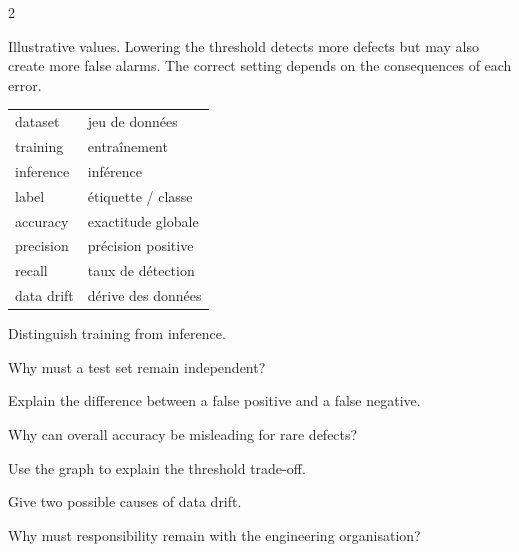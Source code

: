 \begin{multicols}{2}
\begin{tcolorbox}[title=\sffamily\bfseries Defect-detection trade-off,colback=white,colframe=ECPurple]
\begin{center}
\end{center}
\footnotesize Illustrative values. Lowering the threshold detects more defects but may also create more false alarms. The correct setting depends on the consequences of each error.
\end{tcolorbox}

\begin{vocabulary}
\begin{tabularx}{\linewidth}{@{}lX@{}}
dataset & jeu de données\\
training & entraînement\\
inference & inférence\\
label & étiquette / classe\\
accuracy & exactitude globale\\
precision & précision positive\\
recall & taux de détection\\
data drift & dérive des données
\end{tabularx}
\end{vocabulary}

\begin{questions}
\item Distinguish training from inference.
\item Why must a test set remain independent?
\item Explain the difference between a false positive and a false negative.
\item Why can overall accuracy be misleading for rare defects?
\item Use the graph to explain the threshold trade-off.
\item Give two possible causes of data drift.
\item Why must responsibility remain with the engineering organisation?
\end{questions}


\end{multicols}
